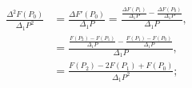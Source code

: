 \begin{align} \frac{\Delta^2F(P_0)}{\Delta_1P^2} & =\frac{\Delta F'(P_0)}{\Delta_1P}=\frac{\frac{\Delta F(P_1)}{\Delta_1P}-\frac{\Delta F(P_0)}{\Delta_1P}}{\Delta_1P}, \\[10pt] & =\frac{\frac{F(P_2)-F(P_1)}{\Delta_1P}-\frac{F(P_1)-F(P_0)}{\Delta_1P}}{\Delta_1P}, \\[10pt] & =\frac{F(P_2)-2F(P_1)+F(P_0)}{\Delta_1P^2}; \end{align}
